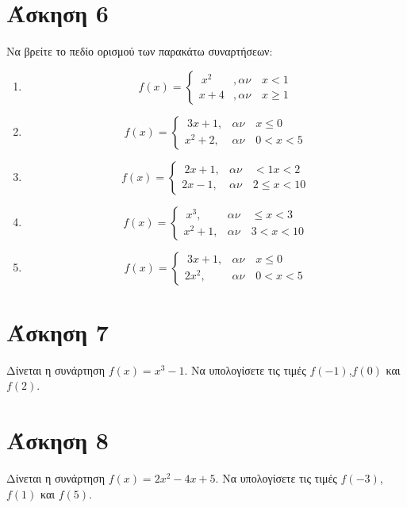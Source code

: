 \documentclass[a4paper,10pt]{report}
\begin{document}
\section*{Άσκηση 6  \hfill \small{}}
Να βρείτε το πεδίο ορισμού των παρακάτω συναρτήσεων:
\begin{enumerate}[1)]
\item  $$ f(x)=\begin{cases} 
                \ x^{2}   &, αν\quad x< 1 \\
                  x+4     &, αν\quad x\ge 1
               \end{cases} $$
\item  $$ f(x)=\begin{cases} 
                \ 3x+1   , & αν\quad x\le 0 \\
                  x^{2}+2    , & αν\quad 0<x<5
               \end{cases} $$ 
\item  $$ f(x)=\begin{cases} 
                \ 2x+1       , & αν\quad <1x<2 \\
                  2x-1       , & αν\quad 2\le x<10
               \end{cases} $$                
\item  $$ f(x)=\begin{cases} 
                \ x^{3}      , & αν\quad \le x<3 \\
                  x^{2}+1    , & αν\quad 3<x<10
               \end{cases} $$  
\item  $$ f(x)=\begin{cases} 
                \ 3x+1      , & αν\quad x\le 0 \\
                  2x^{2}    , & αν\quad 0<x<5
               \end{cases} $$                              
\end{enumerate} 

\section*{Άσκηση 7  \hfill \small{}}
Δίνεται η συνάρτηση $f(x)=x^{3}-1$. Να υπολογίσετε τις τιμές $f(-1)$,$f(0)$ και $f(2)$.

\section*{Άσκηση 8  \hfill \small{}}
Δίνεται η συνάρτηση $f(x)=2x^{2}-4x+5$. Να υπολογίσετε τις τιμές $f(-3)$,$f(1)$ και $f(5)$.
\end{document}
